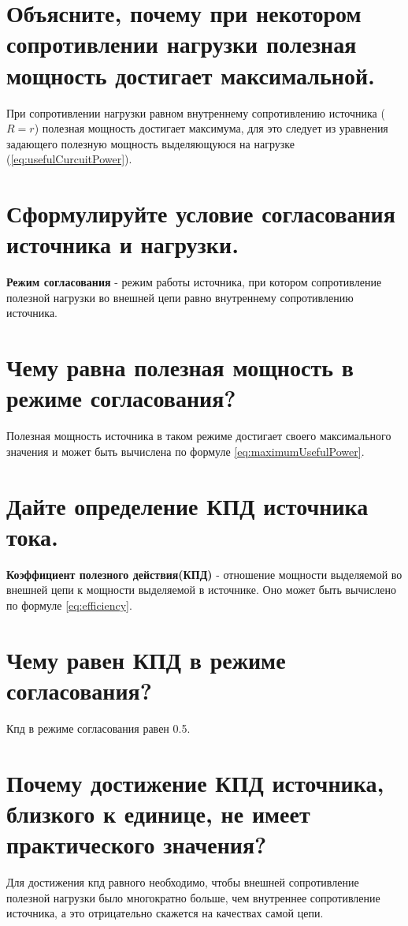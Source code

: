\documentclass[14pt, a4paper, twoside]{extreport}
\begin{document}
\section{Объясните, почему при некотором сопротивлении нагрузки полезная мощность достигает максимальной.}

При сопротивлении нагрузки равном внутреннему сопротивлению источника ($R = r$) полезная мощность достигает максимума, для это следует из уравнения задающего полезную мощность  выделяющуюся на нагрузке (\ref{eq:usefulCurcuitPower}).

\section{Сформулируйте условие согласования источника и нагрузки.}

\textbf{Режим согласования} - режим работы источника, при котором сопротивление полезной нагрузки во внешней цепи равно внутреннему сопротивлению источника.

\section{Чему равна полезная мощность в режиме согласования?}

Полезная мощность источника в таком режиме достигает своего максимального значения и может быть вычислена по формуле \ref{eq:maximumUsefulPower}.

\section{Дайте определение КПД источника тока.}

\textbf{Коэффициент полезного действия(КПД)} -  отношение мощности выделяемой во внешней цепи к мощности выделяемой в источнике. Оно может быть вычислено по формуле \ref{eq:efficiency}.

\section{Чему равен КПД в режиме согласования?}

Кпд в режиме согласования равен 0.5.

\section{Почему достижение КПД источника, близкого к единице, не имеет практического значения?}

Для достижения кпд равного необходимо, чтобы внешней сопротивление полезной нагрузки было многократно больше, чем внутреннее сопротивление источника, а это отрицательно скажется на качествах самой цепи.
\end{document}
